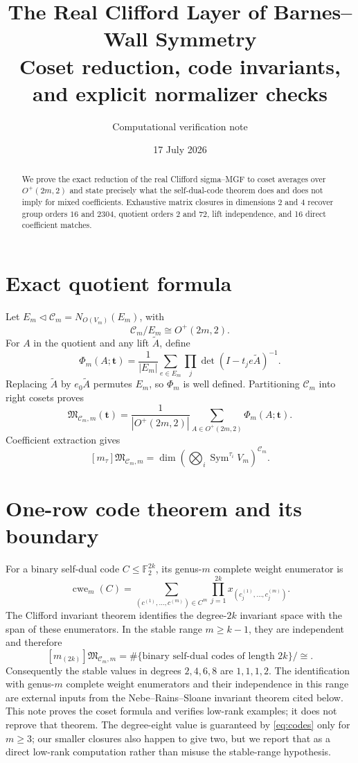 \documentclass[11pt]{article}
\title{\color{navy}\bfseries The Real Clifford Layer of Barnes--Wall Symmetry\\
\large Coset reduction, code invariants, and explicit normalizer checks}
\author{Computational verification note}\date{17 July 2026}
\newcommand{\MGF}{\mathfrak M}
\begin{document}
\maketitle

\begin{abstract}
We prove the exact reduction of the real Clifford sigma--MGF to coset
averages over $O^+(2m,2)$ and state precisely what the self-dual-code theorem
does and does not imply for mixed coefficients.  Exhaustive matrix closures
in dimensions $2$ and $4$ recover group orders $16$ and $2304$, quotient
orders $2$ and $72$, lift independence, and 16 direct coefficient matches.
\end{abstract}

\section{Exact quotient formula}
Let $E_m\triangleleft\mathcal C_m=N_{O(V_m)}(E_m)$, with
\[
 \mathcal C_m/E_m\cong O^+(2m,2).
\]
For $A$ in the quotient and any lift $\widetilde A$, define
\[
 \Phi_m(A;\mathbf t)=\frac1{|E_m|}\sum_{e\in E_m}
 \prod_j\det(I-t_je\widetilde A)^{-1}.
\]
Replacing $\widetilde A$ by $e_0\widetilde A$ permutes $E_m$, so $\Phi_m$
is well defined.  Partitioning $\mathcal C_m$ into right cosets proves
\begin{equation}\label{eq:coset}
\boxed{\MGF_{\mathcal C_m,m}(\mathbf t)=
\frac1{|O^+(2m,2)|}\sum_{A\in O^+(2m,2)}\Phi_m(A;\mathbf t).}
\end{equation}
Coefficient extraction gives
\[
[m_\tau]\MGF_{\mathcal C_m,m}=
\dim\left(\bigotimes_i\operatorname{Sym}^{\tau_i}V_m\right)^{\mathcal C_m}.
\]

\section{One-row code theorem and its boundary}
For a binary self-dual code $C\leq\mathbb F_2^{2k}$, its genus-$m$
complete weight enumerator is
\[
 \operatorname{cwe}_m(C)=\sum_{(c^{(1)},\ldots,c^{(m)})\in C^m}
 \prod_{j=1}^{2k}x_{(c_j^{(1)},\ldots,c_j^{(m)})}.
\]
The Clifford invariant theorem identifies the degree-$2k$ invariant space
with the span of these enumerators.  In the stable range $m\geq k-1$, they
are independent and therefore
\begin{equation}\label{eq:codes}
 [m_{(2k)}]\MGF_{\mathcal C_m,m}
 =\#\{\text{binary self-dual codes of length }2k\}/\!\cong.
\end{equation}
Consequently the stable values in degrees $2,4,6,8$ are $1,1,1,2$.
The identification with genus-$m$ complete weight enumerators and their
independence in this range are external inputs from the
Nebe--Rains--Sloane invariant theorem cited below.  This note proves the coset
formula and verifies low-rank examples; it does not reprove that theorem.
The degree-eight value is guaranteed by \eqref{eq:codes} only for $m\geq3$;
our smaller closures also happen to give two, but we report that as a direct
low-rank computation rather than misuse the stable-range hypothesis.
\end{document}

